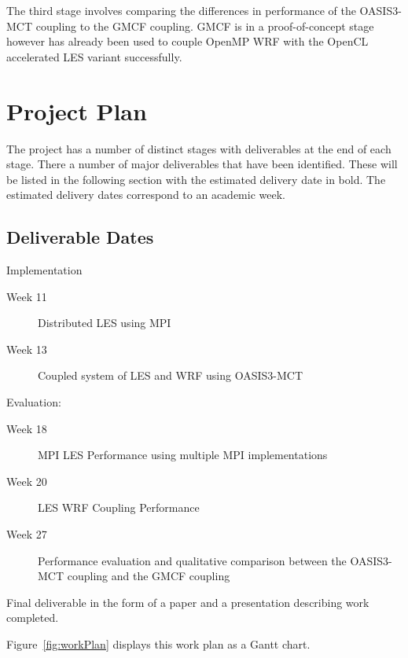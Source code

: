 \documentclass{acm_proc_article-sp}
\begin{document}
The third stage involves comparing the differences in performance of the
OASIS3-MCT coupling to the GMCF coupling. GMCF is in a proof-of-concept stage
however has already been used to couple OpenMP WRF with the OpenCL accelerated
LES variant successfully.

\section{Project Plan}

The project has a number of distinct stages with deliverables at the end of each
stage. There a number of major deliverables that have been identified. These
will be listed in the following section with the estimated delivery date in
bold. The estimated delivery dates correspond to an academic week.

\subsection{Deliverable Dates}

\begin{description}
    \item
    \item[Week 13] Implementation
    \begin{description}
	    \item[Week 11] Distributed LES using MPI
	    \item[Week 13] Coupled system of LES and WRF using OASIS3-MCT
    \end{description}
	\item[Week 27] Evaluation:
    \begin{description}
        \item[Week 18] MPI LES Performance using multiple MPI implementations
        \item[Week 20] LES WRF Coupling Performance
        \item[Week 27] Performance evaluation and qualitative comparison between
        the OASIS3-MCT coupling and the GMCF coupling
    \end{description}
    \item[Week 31] Final deliverable in the form of a paper and a presentation
    describing work completed.
\end{description}

Figure~\ref{fig:workPlan} displays this work plan as a Gantt chart.
\end{document}
